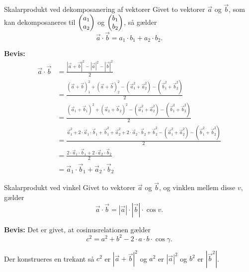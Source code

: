 \documentclass{article}
\begin{document}
\begin{theorem}{Skalarprodukt ved dekomposanering af vektorer}{}
	Givet to vektorer $\vec{a}$ og $\vec{b}$, som kan dekomposaneres til $ \begin{pmatrix} a_1\\ a_2 \end{pmatrix} $ og $ \begin{pmatrix} b_1\\ b_2 \end{pmatrix} $, så gælder
	\[
		\vec{a} \cdot \vec{b} = a_1 \cdot b_1 + a_2 \cdot b_2.
	\] 
\end{theorem}
\textbf{Bevis:}
\begin{align*}
	\vec{a} \cdot \vec{b} &= \frac{|\vec{a} + \vec{b}|^2 - |\vec{a}|^2 - |\vec{b}|^2}{2}\\
						  &= \frac{(\vec{a} + \vec{b})_1^2 + (\vec{a} + \vec{b})_2^2 - (\vec{a}_1^2 + \vec{a}_2^2) - (\vec{b}_1^2 + \vec{b}_2^2)}{2}\\
						  &= \frac{(\vec{a}_1 + \vec{b}_1)^2 + (\vec{a}_2 + \vec{b}_2)^2 - (\vec{a}_1^2 + \vec{a}_2^2) - (\vec{b}_1^2 + \vec{b}_2^2)}{2}\\
						  &= \frac{\vec{a}_1^2 + 2 \cdot \vec{a}_1 \cdot \vec{b}_1 + \vec{b}_1^2 + \vec{a}_2^2 + 2 \cdot \vec{a}_2 \cdot \vec{b}_2 + \vec{b}_2^2 - (\vec{a}_1^2 + \vec{a}_2^2) - (\vec{b}_1^2 + \vec{b}_2^2)}{2}\\
						  &= \frac{2 \cdot \vec{a}_1 \cdot \vec{b}_1 + 2 \cdot \vec{a}_2 \cdot \vec{b}_2}{2}\\
						  &= \vec{a}_1 \cdot \vec{b}_1 + \vec{a}_2 \cdot \vec{b}_2
\end{align*}

\begin{theorem}{Skalarprodukt ved vinkel}{}
	Givet to vektorer $\vec{a}$ og $\vec{b}$, og vinklen mellem disse $v$, gælder
	\[
		\vec{a} \cdot \vec{b} = |\vec{a}| \cdot |\vec{b}| \cdot \cos{v}.
	\] 
\end{theorem}
\textbf{Bevis:}
Det er givet, at cosinusrelationen gælder
\[
	c^2 = a^2 + b^2 - 2 \cdot a \cdot b \cdot \cos{\gamma}.
\] 
\begin{center}
\end{center}

Der konstrueres en trekant så $c^2$ er $|\vec{a} + \vec{b}|^2$ og $a^2$ er
$|\vec{a}|^2$ og $b^2$ er $|\vec{b}^2|$.
\smallskip

\begin{center}
\end{center}
\end{document}
